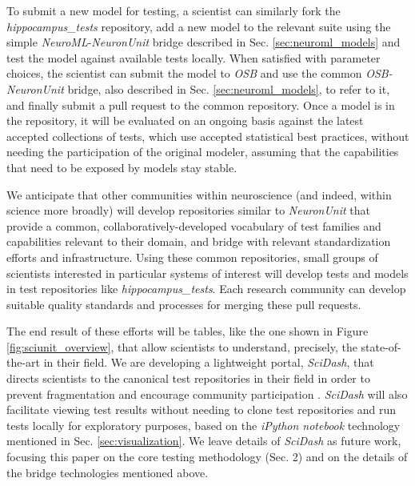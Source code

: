 \documentclass{frontiersSCNS}
\begin{document}
To submit a new model for testing, a scientist can similarly fork the \textit{hippocampus\_tests} repository, add a new model to the relevant suite using the simple \textit{NeuroML}-\textit{NeuronUnit} bridge described in Sec. \ref{sec:neuroml_models} and test the model against available tests locally. When satisfied with parameter choices, the scientist can submit the model to \textit{OSB} and use the common \textit{OSB-NeuronUnit} bridge, also described in Sec. \ref{sec:neuroml_models}, to refer to it, and finally submit a pull request to the common repository. Once a model is in the repository, it will be evaluated on an ongoing basis against the latest accepted collections of tests, which use accepted statistical best practices, without needing the participation of the original modeler, assuming that the capabilities that need to be exposed by models stay stable.

We anticipate that other communities within neuroscience (and indeed, within science more broadly) will develop repositories similar to \textit{NeuronUnit} that provide a common, collaboratively-developed vocabulary of test families and capabilities relevant to their domain, and bridge with relevant standardization efforts and infrastructure. Using these common repositories, small groups of scientists interested in particular systems of interest will develop tests and models in test repositories like \textit{hippocampus\_tests}. Each research community can develop suitable quality standards and processes for merging these pull requests. 

The end result of these efforts will be tables, like the one shown in Figure \ref{fig:sciunit_overview}, that allow scientists to understand, precisely, the state-of-the-art in their field. We are developing a lightweight portal, \textit{SciDash}, that directs scientists to the canonical test repositories in their field in order to prevent fragmentation and encourage community participation . \textit{SciDash} will also facilitate viewing test results without needing to clone test repositories and run tests locally for exploratory purposes, based on the \textit{iPython notebook} technology mentioned in Sec. \ref{sec:visualization}. We leave details of \textit{SciDash} as future work, focusing this paper on the core testing methodology (Sec. 2) and on the details of the bridge technologies mentioned above.
\end{document}
